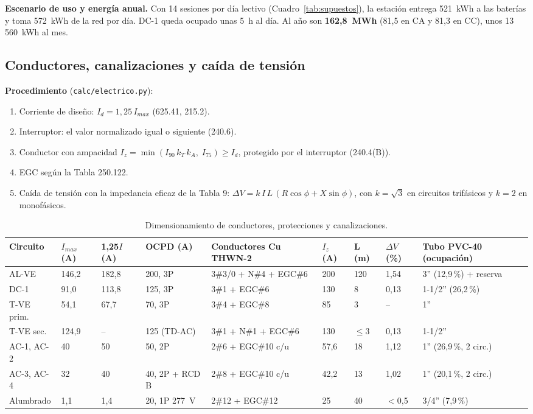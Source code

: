 \textbf{Escenario de uso y energía anual.} Con 14 sesiones por día lectivo (Cuadro~\ref{tab:supuestos}), la estación entrega 521~kWh a las baterías y toma 572~kWh de la red por día. DC-1 queda ocupado unas 5~h al día. Al año son \textbf{162,8~MWh} (81,5 en CA y 81,3 en CC), unos 13\,560~kWh al mes.

\subsection{Conductores, canalizaciones y caída de tensión}
\label{sec:cond}
\textbf{Procedimiento} (\texttt{calc/electrico.py}):
\begin{enumerate}
\item Corriente de diseño: $I_d=1{,}25\,I_{max}$ (625.41, 215.2).
\item Interruptor: el valor normalizado igual o siguiente (240.6).
\item Conductor con ampacidad $I_z=\min(I_{90}\,k_T\,k_A,\;I_{75})\ge I_d$, protegido por el interruptor (240.4(B)).
\item EGC según la Tabla 250.122.
\item Caída de tensión con la impedancia eficaz de la Tabla 9: $\Delta V=k\,I\,L\,(R\cos\phi+X\sin\phi)$, con $k=\sqrt3$ en circuitos trifásicos y $k=2$ en monofásicos.
\end{enumerate}

\begin{table}[H]
\centering\small
\caption{Dimensionamiento de conductores, protecciones y canalizaciones.}\label{tab:conductores}
\footnotesize\setlength{\tabcolsep}{3pt}
\begin{tabular}{L{1.5cm}R{1.0cm}R{1.0cm}L{1.9cm}L{3.0cm}R{0.9cm}R{0.7cm}R{0.9cm}L{2.7cm}}
\toprule
\textbf{Circuito} & \textbf{$I_{max}$ (A)} & \textbf{1,25$I$ (A)} & \textbf{OCPD (A)} & \textbf{Conductores Cu THWN-2} & \textbf{$I_z$ (A)} & \textbf{L (m)} & \textbf{$\Delta V$ (\%)} & \textbf{Tubo PVC-40 (ocupación)}\\
\midrule
AL-VE & 146,2 & 182,8 & 200, 3P & 3\#3/0 + N\#4 + EGC\#6 & 200 & 120 & 1,54 & 3'' (12,9\,\%) + reserva\\
DC-1 & 91,0 & 113,8 & 125, 3P & 3\#1 + EGC\#6 & 130 & 8 & 0,13 & 1-1/2'' (26,2\,\%)\\
T-VE prim. & 54,1 & 67,7 & 70, 3P & 3\#4 + EGC\#8 & 85 & 3 & -- & 1''\\
T-VE sec. & 124,9 & -- & 125 (TD-AC) & 3\#1 + N\#1 + EGC\#6 & 130 & $\le$3 & 0,13 & 1-1/2''\\
AC-1, AC-2 & 40 & 50 & 50, 2P & 2\#6 + EGC\#10 c/u & 57,6 & 18 & 1,12 & 1'' (26,9\,\%, 2 circ.)\\
AC-3, AC-4 & 32 & 40 & 40, 2P + RCD B & 2\#8 + EGC\#10 c/u & 42,2 & 13 & 1,02 & 1'' (20,1\,\%, 2 circ.)\\
Alumbrado & 1,1 & 1,4 & 20, 1P 277~V & 2\#12 + EGC\#12 & 25 & 40 & $<$0,5 & 3/4'' (7,9\,\%)\\
\bottomrule
\end{tabular}
\end{table}

